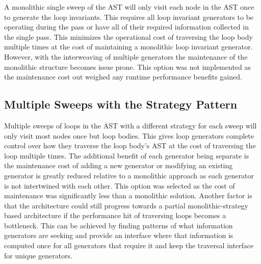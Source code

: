 A monolithic single sweep of the AST will only visit each
node in the AST once to generate the loop invariants.
This requires all loop invariant generators to be operating
during the pass or have all of their required information collected
in the single pass.
This minimizes the operational cost of traversing the loop body
multiple times at the cost of maintaining a monolithic loop invariant generator.
However, with the interweaving of multiple generators the maintenance of the
monolithic structure becomes issue prone.
This option was not implemented as the maintenance cost out weighed any
runtime performance benefits gained.



\subsection{Multiple Sweeps with the Strategy Pattern}

Multiple sweeps of loops in the AST with a different strategy for each sweep
will only visit most nodes once but loop bodies.
This gives loop generators complete control over how they traverse the loop
body's AST at the cost of traversing the loop multiple times.
The additional benefit of each generator being separate is the maintenance cost
of adding a new generator or modifying an existing generator is greatly reduced
relative to a monolithic approach as each generator is not intertwined with
each other.
This option was selected as the cost of maintenance was significantly less
than a monolithic solution.
Another factor is that the architecture could still progress towards
a partial monolithic-strategy based architecture if the performance hit
of traversing loops becomes a bottleneck.
This can be achieved by finding patterns of what information generators are
seeking and provide an interface where that information is computed once for
all generators that require it and keep the traversal interface for unique generators.

